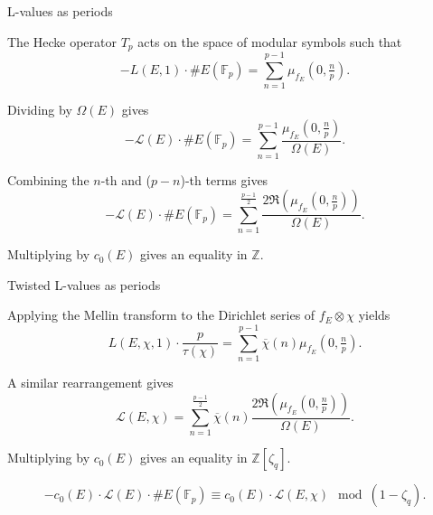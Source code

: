 \documentclass[10pt]{beamer}
\begin{document}
\begin{frame}[t]{L-values as periods}

The Hecke operator $ T_p $ acts on the space of modular symbols such that
$$ -L(E, 1) \cdot \#E(\mathbb{F}_p) = \sum_{n = 1}^{p - 1} \mu_{f_E}(0, \tfrac{n}{p}). $$

\pause

Dividing by $ \Omega(E) $ gives
$$ -\mathcal{L}(E) \cdot \#E(\mathbb{F}_p) = \sum_{n = 1}^{p - 1} \dfrac{\mu_{f_E}(0, \tfrac{n}{p})}{\Omega(E)}. $$

\pause

Combining the $ n $-th and ($ p - n $)-th terms gives
$$ -\mathcal{L}(E) \cdot \#E(\mathbb{F}_p) = \sum_{n = 1}^{\tfrac{p - 1}{2}} \dfrac{2\Re(\mu_{f_E}(0, \tfrac{n}{p}))}{\Omega(E)}. $$

\pause

Multiplying by $ c_0(E) $ gives an equality in $ \mathbb{Z} $.

\end{frame}

\begin{frame}[t]{Twisted L-values as periods}

Applying the Mellin transform to the Dirichlet series of $ f_E \otimes \chi $ yields
$$ L(E, \chi, 1) \cdot \dfrac{p}{\tau(\chi)} = \sum_{n = 1}^{p - 1} \overline{\chi}(n)\mu_{f_E}(0, \tfrac{n}{p}). $$

\pause

A similar rearrangement gives
$$ \mathcal{L}(E, \chi) = \sum_{n = 1}^{\tfrac{p - 1}{2}} \overline{\chi}(n)\dfrac{2\Re(\mu_{f_E}(0, \tfrac{n}{p}))}{\Omega(E)}. $$

\pause

Multiplying by $ c_0(E) $ gives an equality in $ \mathbb{Z}[\zeta_q] $.

\pause

\vspace{0.5cm}

\begin{theorem}[Manin]
$$ -c_0(E) \cdot \mathcal{L}(E) \cdot \#E(\mathbb{F}_p) \equiv c_0(E) \cdot \mathcal{L}(E, \chi) \mod (1 - \zeta_q). $$
\end{theorem}

\end{frame}
\end{document}
